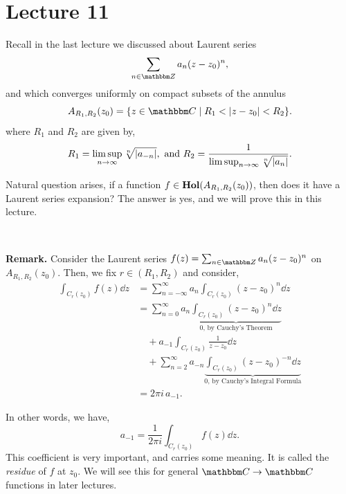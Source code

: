\documentclass[../ComplexAnalysis_Notes.tex]{subfiles}
\begin{document}
\chapter*{Lecture 11} %
\setcounter{chapter}{11} %
\setcounter{section}{0}
\setcounter{equation}{0}
\setcounter{figure}{0}

Recall in the last lecture we discussed about Laurent series
\[
  \sum_{n \in \Z} a_n (z - z_0)^n,
\]
and which converges uniformly on compact subsets of the annulus
\[
  A_{R_1, R_2}(z_0) = \qty{ z \in \C \mid R_1 < \abs{z - z_0} < R_2 }.
\]
where \(R_1\) and \(R_2\) are given by,
\begin{equation} \label{eq:lsorc}
  R_1 = \limsup_{n \to \infty} \sqrt[n]{\abs{a_{-n}}}, \text{ and } R_2 = \frac{1}{\limsup_{n \to \infty} \sqrt[n]{\abs{a_n}}}.
\end{equation}

Natural question arises, if a function \(f \in \operatorname{\mathbf{Hol}}(A_{R_1, R_2}(z_0))\), then does it have a Laurent series expansion? The answer is yes, and we will prove this in this lecture.

\

\textbf{Remark.} Consider the Laurent series \(f(z) = \sum_{n \in \Z} a_n (z - z_0)^n\) on \(A_{R_1, R_2}(z_0)\). Then, we fix \(r \in (R_1, R_2)\) and consider,
\begin{align*}
  \int_{C_r(z_0)} f(z) \dd{z}
   & = \sum_{n = -\infty}^{\infty} a_n \int_{C_r(z_0)} (z - z_0)^n \dd{z}                                                               \\
   & = \sum_{n = 0}^{\infty} a_n \underbrace{\int_{C_r(z_0)} (z - z_0)^n \dd{z}}_{0,\, \text{by Cauchy's Theorem}}                      \\
   & \quad + a_{-1} \int_{C_r(z_0)} \frac{1}{z - z_0} \dd{z}                                                                            \\
   & \quad + \sum_{n = 2}^{\infty} a_{-n} \underbrace{\int_{C_r(z_0)} (z - z_0)^{-n} \dd{z}}_{0,\, \text{by Cauchy's Integral Formula}} \\
   & = 2\pi i\, a_{-1}.
\end{align*}

In other words, we have,
\[
  a_{-1} = \frac{1}{2 \pi i} \int_{C_r(z_0)} f(z) \dd{z}.
\]
This coefficient is very important, and carries some meaning. It is called the \textit{residue} of \(f\) at \(z_0\). We will see this for general \(\C \to \C\) functions in later lectures.
\end{document}
